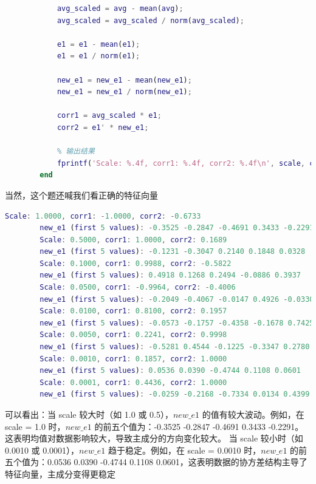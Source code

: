 \documentclass[answers]{exam}  %
\begin{document}
\begin{enumerate}[label=\alph*.]
\begin{lstlisting}[language=matlab]
            % 计算相关性
            avg_scaled = avg - mean(avg);
            avg_scaled = avg_scaled / norm(avg_scaled);
            
            e1 = e1 - mean(e1);
            e1 = e1 / norm(e1);
            
            new_e1 = new_e1 - mean(new_e1);
            new_e1 = new_e1 / norm(new_e1);
            
            corr1 = avg_scaled * e1;
            corr2 = e1' * new_e1;
            
            % 输出结果
            fprintf('Scale: %.4f, corr1: %.4f, corr2: %.4f\n', scale, corr1, corr2);
        end
    \end{lstlisting}
    当然，这个题还喊我们看正确的特征向量
    \begin{lstlisting}[language=matlab]
        Scale: 1.0000, corr1: -1.0000, corr2: -0.6733
        new_e1 (first 5 values): -0.3525 -0.2847 -0.4691 0.3433 -0.2291
        Scale: 0.5000, corr1: 1.0000, corr2: 0.1689
        new_e1 (first 5 values): -0.1231 -0.3047 0.2140 0.1848 0.0328
        Scale: 0.1000, corr1: 0.9988, corr2: -0.5822
        new_e1 (first 5 values): 0.4918 0.1268 0.2494 -0.0886 0.3937
        Scale: 0.0500, corr1: -0.9964, corr2: -0.4006
        new_e1 (first 5 values): -0.2049 -0.4067 -0.0147 0.4926 -0.0330
        Scale: 0.0100, corr1: 0.8100, corr2: 0.1957
        new_e1 (first 5 values): -0.0573 -0.1757 -0.4358 -0.1678 0.7425
        Scale: 0.0050, corr1: 0.2241, corr2: 0.9998
        new_e1 (first 5 values): -0.5281 0.4544 -0.1225 -0.3347 0.2780
        Scale: 0.0010, corr1: 0.1857, corr2: 1.0000
        new_e1 (first 5 values): 0.0536 0.0390 -0.4744 0.1108 0.0601
        Scale: 0.0001, corr1: 0.4436, corr2: 1.0000
        new_e1 (first 5 values): -0.0259 -0.2168 -0.7334 0.0134 0.4399
    \end{lstlisting}
    可以看出：当 scale 较大时（如 1.0 或 0.5），$new\_e1$ 的值有较大波动。例如，在 scale = 1.0 时，$new\_e1$ 的前五个值为：-0.3525 -0.2847 -0.4691 0.3433 -0.2291。这表明均值对数据影响较大，导致主成分的方向变化较大。
    当 scale 较小时（如 0.0010 或 0.0001），$new\_e1$ 趋于稳定。例如，在 scale = 0.0010 时，$new\_e1$ 的前五个值为：0.0536 0.0390 -0.4744 0.1108 0.0601，这表明数据的协方差结构主导了特征向量，主成分变得更稳定
\end{enumerate}
\end{document}
